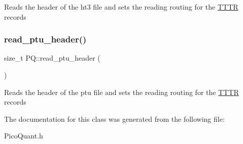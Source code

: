 Reads the header of the ht3 file and sets the reading routing for the \hyperlink{class_t_t_t_r}{T\+T\+TR} records \mbox{\label{class_p_q_a044423a28b6d028170504788cdb9b672}} 
\subsubsection{\texorpdfstring{read\+\_\+ptu\+\_\+header()}{read\_ptu\_header()}}
{\footnotesize\ttfamily size\+\_\+t P\+Q\+::read\+\_\+ptu\+\_\+header (\begin{DoxyParamCaption}{ }\end{DoxyParamCaption})\hspace{0.3cm}{\ttfamily [protected]}}

Reads the header of the ptu file and sets the reading routing for the \hyperlink{class_t_t_t_r}{T\+T\+TR} records 

The documentation for this class was generated from the following file\+:\begin{DoxyCompactItemize}
\item 
Pico\+Quant.\+h\end{DoxyCompactItemize}
